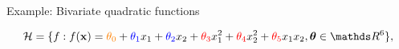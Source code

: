 \documentclass[11pt,compress,t,notes=noshow, xcolor=table]{beamer}
\begin{document}
\begin{vbframe}{Example: Bivariate quadratic functions}
  
  \begin{equation*}
    \Hspace = \{f: \fx =  
    \textcolor{orange}{\theta_0} + \textcolor{blue}{\theta_1} x_1 + 
    \textcolor{blue}{\theta_2} x_2 + \textcolor{red}{\theta_3} x_1^2 + 
    \textcolor{red}{\theta_4} x_2^2 + \textcolor{red}{\theta_5} x_1 x_2, 
    \thetav \in \R^6\},
  \end{equation*}
  
  
  \vspace*{-\baselineskip}
  

\end{vbframe}
\end{document}

